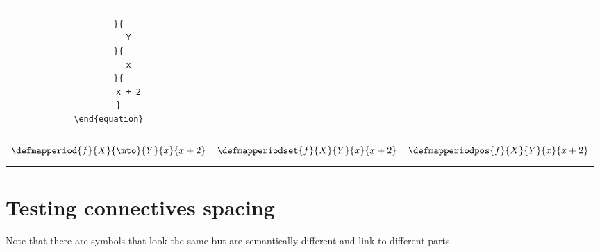 \begin{widepar}
\begin{tabular}{|c|c|c|}
\begin{minipage}{0.3\textwidth}
\begin{verbatim}
    }{
        Y
    }{
        x
    }{
        x + 2
    }
\end{equation}
            \end{verbatim}
        \end{minipage}
        \\
        \begin{minipage}{0.3\textwidth}
            \begin{equation}
                \defmapperiod{
                    f
                }{
                    X
                }{
                    \mto
                }{
                    Y
                }{
                    x
                }{
                    x + 2
                }
            \end{equation}
        \end{minipage}
         &
        \begin{minipage}{0.3\textwidth}
            \begin{equation}
                \defmapperiodset{
                    f
                }{
                    X
                }{
                    Y
                }{
                    x
                }{
                    x + 2
                }
            \end{equation}
        \end{minipage}
         &
        \begin{minipage}{0.3\textwidth}
            \begin{equation}
                \defmapperiodpos{
                    f
                }{
                    X
                }{
                    Y
                }{
                    x
                }{
                    x + 2
                }
            \end{equation}
        \end{minipage}
        \\\hline
    \end{tabular}
\end{widepar}

\vfill\pagebreak

\section{Testing connectives spacing}

Note that there are symbols that look the same but are semantically different and link to different parts.

